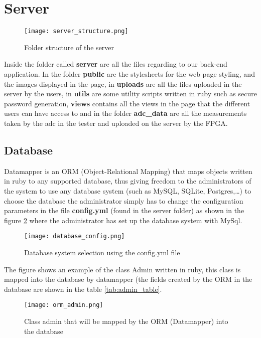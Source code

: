 \section{Server}

\begin{figure}[htb]
\centering
\texttt{[image: server\_structure.png]}
\caption{Folder structure of the server}
\label{fig:server_structure}
\end{figure}

  Inside the folder called {\bf server} are all the files regarding to our back-end application. In the folder {\bf public} are the stylesheets for the web page styling, and the images
displayed in the page, in {\bf uploads} are all the files uploaded in the server by the users, in {\bf utils} are some utility scripts written in ruby such as secure password generation,
{\bf views} contains all the views in the page that the different users can have access to and in the folder {\bf adc\_data} are all the measurements taken by the adc in the tester and uploaded
on the server by the FPGA.

\subsection{Database}

  Datamapper is an ORM (Object-Relational Mapping) that maps objects written in ruby to any supported database, thus giving freedom to the administrators of the system to use any database system (such as
MySQL, SQLite, Postgres,\ldots) to choose the database the administrator simply has to change the configuration parameters in the file {\bf config.yml} (found in the server folder) as shown in the
figure \ref{fig:database_config} where the administrator has set up the database system with MySql.

\begin{figure}[htb]
\centering
\texttt{[image: database\_config.png]}
\caption{Database system selection using the config.yml file}
\label{fig:database_config}
\end{figure}

The figure shows an example of the class Admin written in ruby, this class is mapped into the database by datamapper (the fields created by the ORM in the database are shown in the table \ref{tab:admin_table}.
\begin{figure}[htb]
\centering
\texttt{[image: orm\_admin.png]}
\caption{Class admin that will be mapped by the ORM (Datamapper) into the database}
\label{fig:admin_orm}
\end{figure}

